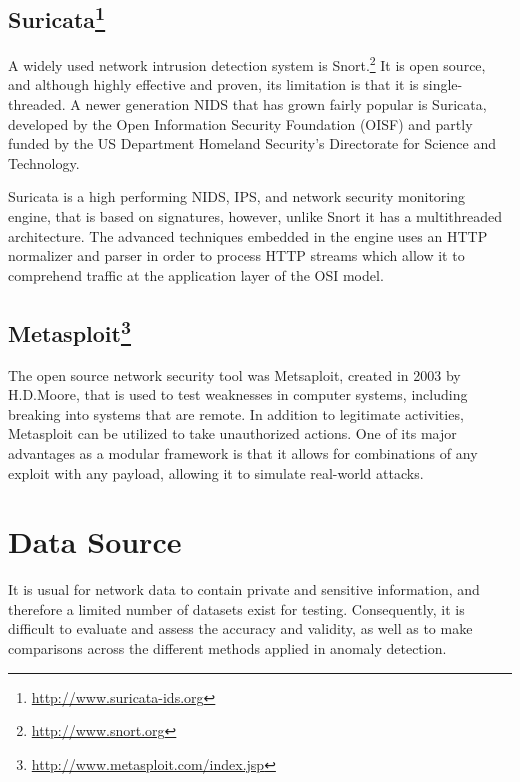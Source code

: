 \documentclass[12pt,]{article}
\let\rmarkdownfootnote\footnote%
\def\footnote{\protect\rmarkdownfootnote}
\begin{document}
\subsection[Suricata]{Suricata\footnote{\url{http://www.suricata-ids.org}}}\label{suricata5}

A widely used network intrusion detection system is Snort.\footnote{\url{http://www.snort.org}}
It is open source, and although highly effective and proven, its
limitation is that it is single-threaded. A newer generation NIDS that
has grown fairly popular is Suricata, developed by the Open Information
Security Foundation (OISF) and partly funded by the US Department
Homeland Security's Directorate for Science and Technology.

Suricata is a high performing NIDS, IPS, and network security monitoring
engine, that is based on signatures, however, unlike Snort it has a
multithreaded architecture. The advanced techniques embedded in the
engine uses an HTTP normalizer and parser in order to process HTTP
streams which allow it to comprehend traffic at the application layer of
the OSI model.

\subsection[Metasploit]{Metasploit\footnote{\url{http://www.metasploit.com/index.jsp}}}\label{metasploit7}

The open source network security tool was Metsaploit, created in 2003 by
H.D.Moore, that is used to test weaknesses in computer systems,
including breaking into systems that are remote. In addition to
legitimate activities, Metasploit can be utilized to take unauthorized
actions. One of its major advantages as a modular framework is that it
allows for combinations of any exploit with any payload, allowing it to
simulate real-world attacks.

\pagebreak

\section{Data Source}\label{data-source}

It is usual for network data to contain private and sensitive
information, and therefore a limited number of datasets exist for
testing. Consequently, it is difficult to evaluate and assess the
accuracy and validity, as well as to make comparisons across the
different methods applied in anomaly detection.
\end{document}
